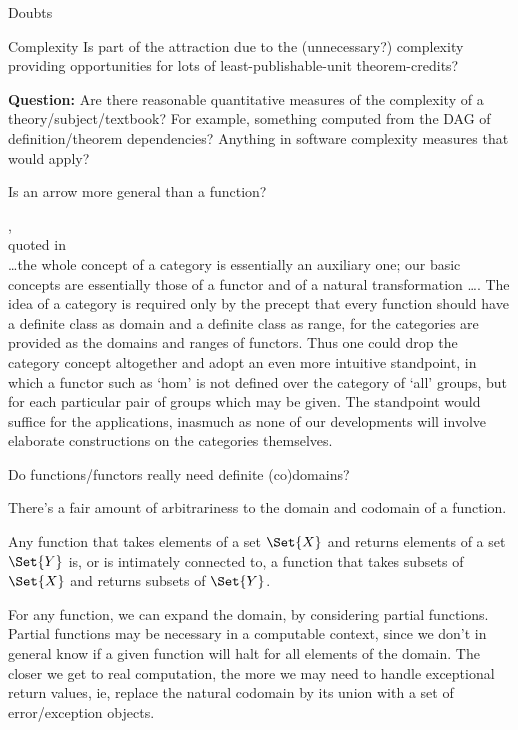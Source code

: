 \begin{plSection}{Doubts}
\begin{plSection}{Complexity}
Is part of the attraction due to the (unnecessary?)
complexity providing opportunities for lots of
least-publishable-unit 
theorem-credits?~\cite{JaffeQuinn:1993:TheoreticalMath,Thurston:1994:Proof}

\textbf{Question:} Are there reasonable quantitative measures
of the complexity of a theory/subject/textbook?
For example, something computed from the DAG of
definition/theorem dependencies?
Anything in software complexity measures that would apply?

\end{plSection}%
\begin{plSection}{Is an arrow more general than a function?}
\label{sec:arrow-more-general}

\begin{plQuote}
{,\\
quoted in \\
}
{}
\ldots the whole concept of a category is essentially 
an auxiliary
one; our basic concepts are essentially those of a functor and of
a natural transformation {\ldots}. 
The idea of a category is required
only by the precept that every function should have a definite
class as domain and a definite class as range, for the categories
are provided as the domains and ranges of functors. Thus one
could drop the category concept altogether and adopt an even
more intuitive standpoint, in which a functor such as ‘hom’ is
not defined over the category of ‘all’ groups, 
but for each particular
pair of groups which may be given. The standpoint would
suffice for the applications, inasmuch as none of our developments
will involve elaborate constructions on the categories
themselves.
\end{plQuote}

Do functions/functors really need definite (co)domains?

There's a fair amount of arbitrariness 
to the domain and codomain of a function.

Any function that takes elements of a set $\Set{X}$
and returns elements of a set $\Set{Y}$
is, or is intimately connected to, 
a function that takes subsets of $\Set{X}$ and returns
subsets of $\Set{Y}$.

For any function, we can expand the domain, by considering partial
functions. 
Partial functions may be necessary in a computable context,
since we don't in general know if a given function will
halt for all elements of the domain.
The closer we get to real computation, the more we may need to
handle exceptional return values, ie, replace the natural
codomain by its union with a set of error/exception objects.


\end{plSection}
\end{plSection}
